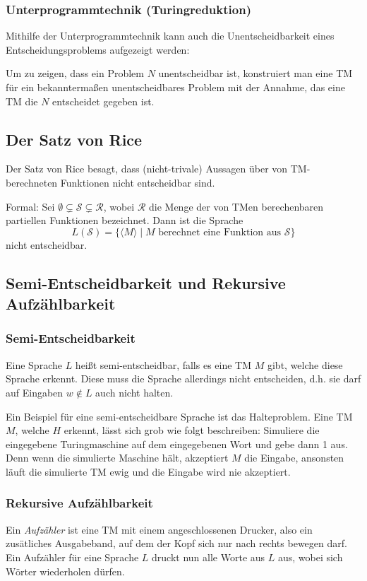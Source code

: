 \documentclass[a4paper,parskip=half*,DIV=7,fontsize=11pt]{scrartcl}
\begin{document}
\subsubsection{Unterprogrammtechnik (Turingreduktion)}
Mithilfe der Unterprogrammtechnik kann auch die  Unentscheidbarkeit eines Entscheidungsproblems aufgezeigt werden:

Um zu zeigen, dass ein Problem $N$ unentscheidbar ist, konstruiert man eine TM für ein bekanntermaßen unentscheidbares Problem mit der Annahme, das eine TM die $N$ entscheidet gegeben ist.

\subsection{Der Satz von Rice}
Der Satz von Rice besagt, dass (nicht-trivale) Aussagen über von TM-berechneten Funktionen nicht entscheidbar sind.

Formal: Sei $\emptyset \varsubsetneq \mathcal S \varsubsetneq \mathcal R$, wobei $\mathcal R$ die  Menge der von TMen berechenbaren partiellen Funktionen bezeichnet.  Dann ist die Sprache 
\[L(\mathcal S ) = \{\langle M \rangle \mid \text{$M$ berechnet eine Funktion aus $\mathcal S$}\}\]
nicht entscheidbar. 

\subsection{Semi-Entscheidbarkeit und Rekursive Aufzählbarkeit}
\subsubsection{Semi-Entscheidbarkeit}
Eine Sprache $L$ heißt semi-entscheidbar, falls es eine TM  $M$ gibt, welche diese Sprache erkennt. Diese muss die Sprache allerdings nicht entscheiden, d.h. sie darf auf Eingaben $w \notin L$ auch nicht halten.

Ein Beispiel für eine semi-entscheidbare Sprache ist das Halteproblem. Eine TM $M$, welche $H$ erkennt, lässt sich grob wie folgt beschreiben:  Simuliere die eingegebene Turingmaschine auf dem eingegebenen Wort und gebe dann 1 aus. Denn wenn die simulierte Maschine hält, akzeptiert $M$ die Eingabe, ansonsten läuft die simulierte TM ewig und die Eingabe wird nie akzeptiert.

\subsubsection{Rekursive Aufzählbarkeit}
Ein \emph{Aufzähler} ist eine TM mit einem angeschlossenen Drucker, also ein zusätliches Ausgabeband, auf dem der Kopf sich nur nach rechts bewegen darf.  Ein Aufzähler für eine Sprache $L$ druckt nun alle Worte aus $L$ aus, wobei sich Wörter wiederholen dürfen.
\end{document}

